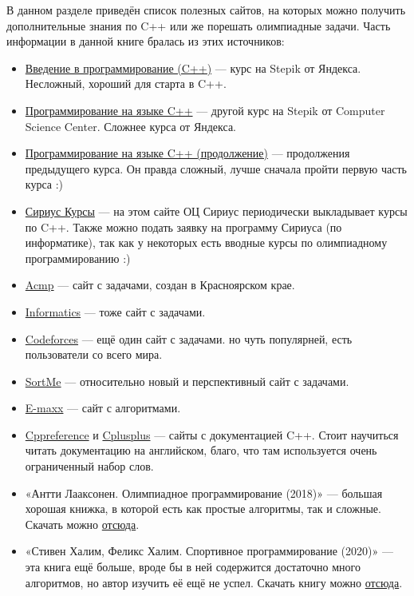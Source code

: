 \hypertarget{0.5}{}
В данном разделе приведён список полезных сайтов, на которых можно получить дополнительные знания по C++ или же порешать олимпиадные задачи. Часть информации в данной книге бралась из этих источников:

\begin{itemize}
    \item \href{https://stepik.org/course/363/}{Введение в программирование (C++)} — курс на Stepik от Яндекса. Несложный, хороший для старта в C++.
    \item \href{https://stepik.org/course/7/}{Программирование на языке C++} — другой курс на Stepik от Computer Science Center. Сложнее курса от Яндекса.
    \item \href{https://stepik.org/course/3206/}{Программирование на языке C++ (продолжение)} — продолжения предыдущего курса. Он правда сложный, лучше сначала пройти первую часть курса :)
    \item \href{https://edu.sirius.online/}{Сириус Курсы} — на этом сайте ОЦ Сириус периодически выкладывает курсы по C++. Также можно подать заявку на программу Сириуса (по информатике), так как у некоторых есть вводные курсы по олимпиадному программированию :)
    \item \href{https://acmp.ru/}{Acmp} — сайт с задачами, создан в Красноярском крае.
    \item \href{https://informatics.msk.ru/}{Informatics} — тоже сайт с задачами.
    \item \href{https://codeforces.com/}{Codeforces} — ещё один сайт с задачами. но чуть популярней, есть пользователи со всего мира.
    \item \href{https://sort-me.org/}{SortMe} — относительно новый и перспективный сайт с задачами.
    \item \href{https://e-maxx.ru/algo/}{E-maxx} — сайт с алгоритмами.
    \item \href{https://ru.cppreference.com/w/}{Cppreference} и \href{https://cplusplus.com/reference/}{Cplusplus} — сайты с документацией C++. Стоит научиться читать документацию на английском, благо, что там используется очень ограниченный набор слов.
    \item «Антти Лааксонен. Олимпиадное программирование (2018)» — большая хорошая книжка, в которой есть как простые алгоритмы, так и сложные. Скачать можно \href{https://drive.google.com/file/d/13RWpaWUpPlMzVGGMzvMm6cjCxWzYzolI/view?usp=sharing}{отсюда}.
    \item «Стивен Халим, Феликс Халим. Спортивное программирование (2020)» — эта книга ещё больше, вроде бы в ней содержится достаточно много алгоритмов, но автор изучить её ещё не успел. Скачать книгу можно \href{https://drive.google.com/file/d/1TS8rambgTvplQ1Xpxl_GTbGZ3O9liV9C/view?usp=sharing}{отсюда}.
\end{itemize}
